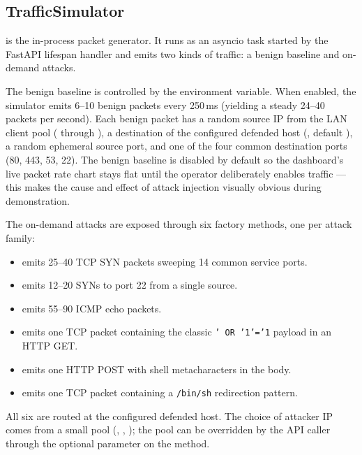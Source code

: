 \subsection{TrafficSimulator}
\label{sec:design-simulator}

 is the in-process packet generator. It runs
as an asyncio task started by the FastAPI lifespan handler and emits
two kinds of traffic: a benign baseline and on-demand attacks.

The benign baseline is controlled by the
 environment variable. When enabled, the
simulator emits 6--10 benign packets every 250\,ms (yielding a
steady 24--40 packets per second). Each benign packet has a random
source IP from the LAN client pool ( through
), a destination of the configured defended host
(, default ), a random
ephemeral source port, and one of the four common destination ports
(80, 443, 53, 22). The benign baseline is disabled by default so
the dashboard's live packet rate chart stays flat until the
operator deliberately enables traffic --- this makes the cause and
effect of attack injection visually obvious during demonstration.

The on-demand attacks are exposed through six factory methods, one
per attack family:

\begin{itemize}
  \item {} emits 25--40 TCP SYN packets
    sweeping 14 common service ports.
  \item {} emits 12--20 SYNs to port 22
    from a single source.
  \item {} emits 55--90 ICMP echo
    packets.
  \item {} emits one TCP packet containing the
    classic \texttt{' OR '1'='1} payload in an HTTP GET.
  \item {} emits one HTTP POST with
    shell metacharacters in the body.
  \item {} emits one TCP packet
    containing a \texttt{/bin/sh} redirection pattern.
\end{itemize}

All six are routed at the configured defended host. The choice of
attacker IP comes from a small pool
(, , );
the pool can be overridden by the API caller through the optional
 parameter on the  method.

